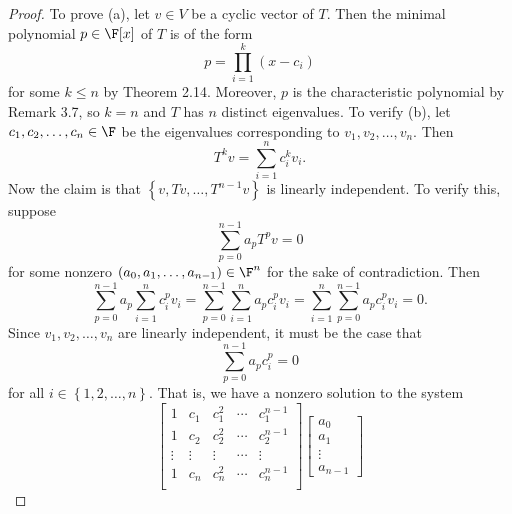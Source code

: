 \documentclass[linearalgebraII]{subfiles}
\begin{document}
    \begin{proof}
        To prove (a), let $v\in V$ be a cyclic vector of $T$. Then the minimal polynomial $p\in\F[x]$ of $T$ is of the form
        \begin{equation*}
            p = \prod^{k}_{i=1} (x-c_i)
        \end{equation*}
        for some $k\leq n$ by Theorem 2.14. Moreover, $p$ is the characteristic polynomial by Remark 3.7, so $k=n$ and $T$ has $n$ distinct eigenvalues. To verify (b), let $c_1, c_2, \ldots, c_n\in\F$ be the eigenvalues corresponding to $v_1, v_2, \ldots, v_n$. Then
        \begin{equation*}
            T^kv = \sum^{n}_{i=1} c_i^kv_i.
        \end{equation*}
        Now the claim is that $\left\lbrace v, Tv, \ldots, T^{n-1}v \right\rbrace$ is linearly independent. To verify this, suppose
        \begin{equation*}
            \sum^{n-1}_{p=0} a_pT^pv = 0
        \end{equation*}
        for some nonzero $\left( a_0, a_1, \ldots, a_{n-1} \right)\in\F^n$ for the sake of contradiction. Then
        \begin{equation*}
            \sum^{n-1}_{p=0} a_p \sum^{n}_{i=1} c_i^pv_i = \sum^{n-1}_{p=0} \sum^{n}_{i=1} a_pc_i^pv_i = \sum^{n}_{i=1} \sum^{n-1}_{p=0} a_pc_i^pv_i = 0.
        \end{equation*}
        Since $v_1, v_2, \ldots, v_n$ are linearly independent, it must be the case that
        \begin{equation*}
            \sum^{n-1}_{p=0} a_pc_i^p = 0
        \end{equation*}
        for all $i\in \left\lbrace 1, 2, \ldots, n \right\rbrace$. That is, we have a nonzero solution to the system
        \begin{equation*}
            \begin{bmatrix}
                1 & c_1 & c_1^2 & \cdots & c_1^{n-1} \\
                1 & c_2 & c_2^2 & \cdots & c_2^{n-1} \\
                \vdots & \vdots & \vdots & \cdots & \vdots \\
                1 & c_n & c_n^2 & \cdots & c_n^{n-1} \\
            \end{bmatrix}
            \begin{bmatrix}
                a_0 \\ a_1 \\ \vdots \\ a_{n-1}

\end{bmatrix}
\end{equation*}
\end{proof}
\end{document}
